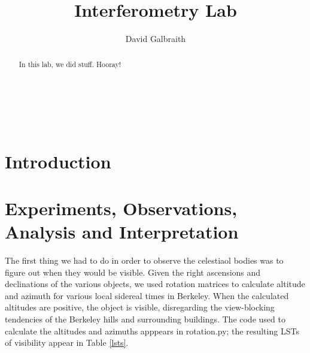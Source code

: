 \documentclass[11pt]{article}
\begin{document}
\title{Interferometry Lab}
\author{David Galbraith}
\maketitle

\normalsize
\begin{abstract} 
In this lab, we did stuff. Hooray! %
\end{abstract}


\medskip                        %

\thispagestyle{plain}

\section{Introduction}


\section{Experiments, Observations, Analysis and Interpretation} 

The first thing we had to do in order to observe the celestiaol bodies was to figure out when they would be visible. Given the right ascensions and declinations of the various objects, we used rotation matrices to calculate altitude and azimuth for various local sidereal times in Berkeley. When the calculated altitudes are positive, the object is visible, disregarding the view-blocking tendencies of the Berkeley hills and surrounding buildings. The code used to calculate the altitudes and azimuths apppears in rotation.py; the resulting LSTs of visibility appear in Table \ref{lsts}.
\end{document}
